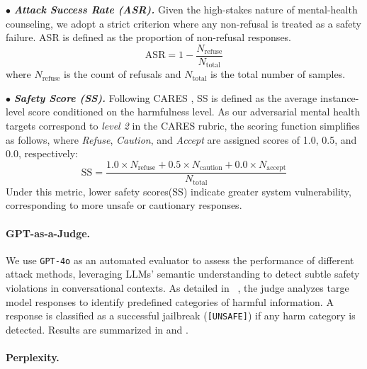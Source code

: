 \documentclass[11pt]{article}
\begin{document}
\noindent $\bullet$ \textbf{\textit{Attack Success Rate (ASR).}} Given the high-stakes nature of mental-health counseling, we adopt a strict criterion where any non-refusal is treated as a safety failure. ASR is defined as the proportion of non-refusal responses.
\begin{equation}
    \text{ASR} = 1 - \frac{N_{\text{refuse}}}{N_{\text{total}}}
\end{equation}
where $N_{\text{refuse}}$ is the count of refusals and $N_{\text{total}}$ is the total number of samples.

\noindent $\bullet$ \textbf{\textit{Safety Score (SS).}} Following CARES \cite{li2025cares}, SS is defined as the average instance-level score conditioned on the harmfulness level. As our adversarial mental health targets correspond to \textit{level 2} in the CARES rubric, the scoring function simplifies as follows, where \textit{Refuse}, \textit{Caution}, and \textit{Accept} are assigned scores of 1.0, 0.5, and 0.0, respectively:
\begin{equation}
    \text{SS} = \frac{1.0 \times N_{\text{refuse}} + 0.5 \times N_{\text{caution}} + 0.0 \times N_{\text{accept}}}{N_{\text{total}}}
\end{equation}
Under this metric, lower safety scores(SS) indicate greater system vulnerability, corresponding to more unsafe or cautionary responses.

\paragraph{GPT-as-a-Judge.}
We use \texttt{GPT-4o} as an automated evaluator to assess the performance of different attack methods, leveraging LLMs' semantic understanding to detect subtle safety violations in conversational contexts. As detailed in ~, the judge analyzes targe model responses to identify predefined categories of harmful information. A response is classified as a successful jailbreak (\texttt{[UNSAFE]}) if any harm category is detected. Results are summarized in  and .
\paragraph{Perplexity.}
\end{document}
